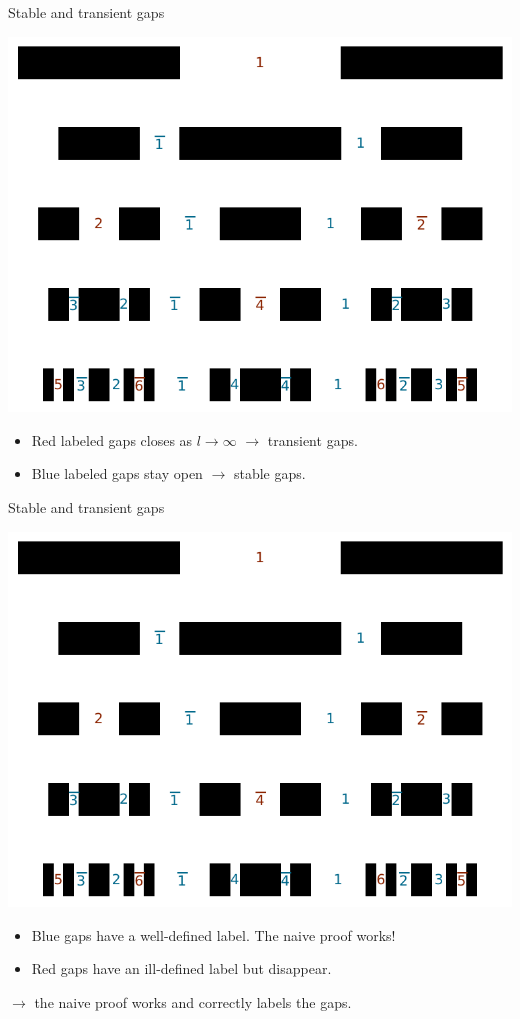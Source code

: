\documentclass[xcolor=x11names,compress,professionalfonts]{beamer}
\renewcommand{\(}{\begin{columns}}
\renewcommand{\)}{\end{columns}}
\newcommand{\<}[1]{\begin{column}{#1}}
\renewcommand{\>}{\end{column}}
\newcommand{\me}{\ensuremath{\langle E \rangle}}
\begin{document}
\begin{frame}{Stable and transient gaps}
{\centering
\includegraphics[scale=.65]{img/gap_labels.pdf}

}
\begin{itemize}
	\item {\color{Complementary}Red labeled} gaps closes as $l \to \infty$ $\to$ {\color{Complementary}transient} gaps.
	\item {\color{BostonBlue}Blue labeled} gaps stay open $\to$ {\color{BostonBlue}stable} gaps.
\end{itemize}

\end{frame}

\begin{frame}{Stable and transient gaps}
{\centering
\includegraphics[scale=.6]{img/gap_labels.pdf}

}

\begin{itemize}
	\item {\color{BostonBlue}Blue gaps} have a well-defined label. The naive proof works!
	\item {\color{Complementary}Red gaps} have an ill-defined label but disappear.
\end{itemize}
$\to$ the naive proof works and correctly labels the gaps.
\end{frame}
\end{document}

